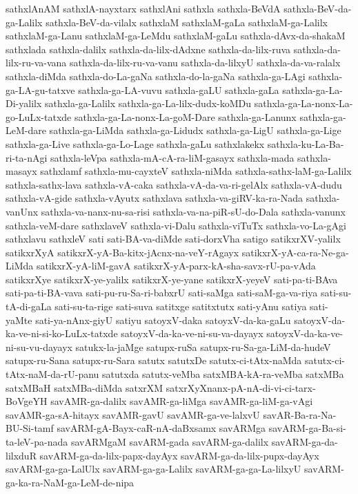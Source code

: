 {sathxlAnAM
sathxlA-nayxtarx
sathxlAni
sathxla
sathxla-BeVdA
sathxla-BeV-da-ga-Lalilx
sathxla-BeV-da-vilalx
sathxlaM
sathxlaM-gaLa
sathxlaM-ga-Lalilx
sathxlaM-ga-Lanu
sathxlaM-ga-LeMdu
sathxlaM-gaLu
sathxla-dAvx-da-shakaM
sathxlada
sathxla-dalilx
sathxla-da-lilx-dAdxne
sathxla-da-lilx-ruva
sathxla-da-lilx-ru-va-vana
sathxla-da-lilx-ru-va-vanu
sathxla-da-lilxyU
sathxla-da-va-ralalx
sathxla-diMda
sathxla-do-La-gaNa
sathxla-do-la-gaNa
sathxla-ga-LAgi
sathxla-ga-LA-gu-tatxve
sathxla-ga-LA-vuvu
sathxla-gaLU
sathxla-gaLa
sathxla-ga-La-Di-yalilx
sathxla-ga-Lalilx
sathxla-ga-La-lilx-dudx-koMDu
sathxla-ga-La-nonx-La-go-LuLx-tatxde
sathxla-ga-La-nonx-La-goM-Dare
sathxla-ga-Lanunx
sathxla-ga-LeM-dare
sathxla-ga-LiMda
sathxla-ga-Lidudx
sathxla-ga-LigU
sathxla-ga-Lige
sathxla-ga-Live
sathxla-ga-Lo-Lage
sathxla-gaLu
sathxlakekx
sathxla-ku-La-Ba-ri-ta-nAgi
sathxla-leVpa
sathxla-mA-cA-ra-liM-gasayx
sathxla-mada
sathxla-masayx
sathxlamf
sathxla-mu-cayxteV
sathxla-niMda
sathxla-sathx-laM-ga-Lalilx
sathxla-sathx-lava
sathxla-vA-caka
sathxla-vA-da-va-ri-gelAlx
sathxla-vA-dudu
sathxla-vA-gide
sathxla-vAyutx
sathxlava
sathxla-va-giRV-ka-ra-Nada
sathxla-vanUnx
sathxla-va-nanx-nu-sa-risi
sathxla-va-na-piR-sU-do-Dala
sathxla-vanunx
sathxla-veM-dare
sathxlaveV
sathxla-vi-Dalu
sathxla-viTuTx
sathxla-vo-La-gAgi
sathxlavu
sathxleV
sati
sati-BA-va-diMde
sati-dorxVha
satigo
satikxrXV-yalilx
satikxrXyA
satikxrX-yA-Ba-kitx-jAcnx-na-veY-rAgayx
satikxrX-yA-ca-ra-Ne-ga-LiMda
satikxrX-yA-liM-gavA
satikxrX-yA-parx-kA-sha-savx-rU-pa-vAda
satikxrXye
satikxrX-ye-yalilx
satikxrX-ye-yane
satikxrX-yeyeV
sati-pa-ti-BAva
sati-pa-ti-BA-vava
sati-pu-ru-Sa-ri-babxrU
sati-saMga
sati-saM-ga-va-riya
sati-su-tA-di-gaLa
sati-su-ta-rige
sati-suva
satitxge
satitxtutx
sati-yAnu
satiya
sati-yaMte
sati-ya-nAnx-giyU
satiyu
satoyxV-daka
satoyxV-da-ka-gaLu
satoyxV-da-ka-ve-ni-si-ko-LuLx-tatxde
satoyxV-da-ka-ve-ni-su-va-dayayx
satoyxV-da-ka-ve-ni-su-vu-dayayx
satukx-la-jaMge
satupx-ruSa
satupx-ru-Sa-ga-LiM-da-hudeV
satupx-ru-Sana
satupx-ru-Sara
satutx
satutxDe
satutx-ci-tAtx-naMda
satutx-ci-tAtx-naM-da-rU-panu
satutxda
satutx-veMba
satxMBA-kA-ra-veMba
satxMBa
satxMBaH
satxMBa-diMda
satxrXM
satxrXyXnanx-pA-nA-di-vi-ci-tarx-BoVgeYH
savAMR-ga-dalilx
savAMR-ga-liMga
savAMR-ga-liM-ga-vAgi
savAMR-ga-sA-hitayx
savAMR-gavU
savAMR-ga-ve-lalxvU
savAR-Ba-ra-Na-BU-Si-tamf
savARM-gA-Bayx-caR-nA-daBxsamx
savARMga
savARM-ga-Ba-si-ta-leV-pa-nada
savARMgaM
savARM-gada
savARM-ga-dalilx
savARM-ga-da-lilxduR
savARM-ga-da-lilx-papx-dayAyx
savARM-ga-da-lilx-pupx-dayAyx
savARM-ga-ga-LalUlx
savARM-ga-ga-Lalilx
savARM-ga-ga-La-lilxyU
savARM-ga-ka-ra-NaM-ga-LeM-de-nipa
}
